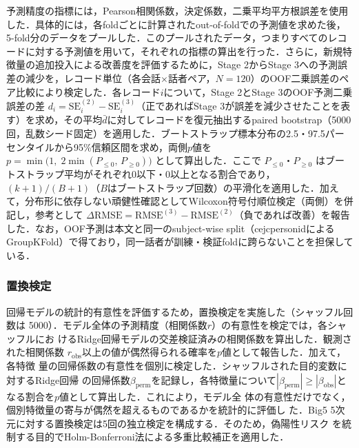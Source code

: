 \documentclass[dvipdfmx,11pt,a4paper]{bxjsarticle}
\renewcommand{\_}{\paperorigunderscore\allowbreak}%
\begin{document}
予測精度の指標には，Pearson相関係数，決定係数，二乗平均平方根誤差を使用した．具体的には，各foldごとに計算されたout-of-foldでの予測値を求めた後，5-fold分のデータをプールした．このプールされたデータ，つまりすべてのレコードに対する予測値を用いて，それぞれの指標の算出を行った．さらに，新規特徴量の追加投入による改善度を評価するために，Stage 2からStage 3への予測誤差の減少を，レコード単位（各会話$\times$話者ペア，$N=120$）のOOF二乗誤差のペア比較により検定した．各レコード$i$について，Stage 2とStage 3のOOF予測二乗誤差の差 $d_i = \mathrm{SE}^{(2)}_i - \mathrm{SE}^{(3)}_i$（正であればStage 3が誤差を減少させたことを表す）を求め，その平均$\bar{d}$に対してレコードを復元抽出するpaired bootstrap（5000回，乱数シード固定）を適用した．ブートストラップ標本分布の2.5・97.5パーセンタイルから95\%信頼区間を求め，両側$p$値を $p = \min\!\bigl(1,\; 2\min(P_{\le 0},\, P_{\ge 0})\bigr)$ として算出した．ここで $P_{\le 0}$・$P_{\ge 0}$ はブートストラップ平均がそれぞれ0以下・0以上となる割合であり，$(k+1)/(B+1)$（$B$はブートストラップ回数）の平滑化を適用した．加えて，分布形に依存しない頑健性確認としてWilcoxon符号付順位検定（両側）を併記し，参考として $\Delta\mathrm{RMSE} = \mathrm{RMSE}^{(3)} - \mathrm{RMSE}^{(2)}$（負であれば改善）を報告した．なお，OOF予測は本文と同一のsubject-wise split（cejc\_person\_idによるGroupKFold）で得ており，同一話者が訓練・検証foldに跨らないことを担保している．


\subsubsection{置換検定}

回帰モデルの統計的有意性を評価するため，置換検定を実施した（シャッフル回数は
5000）．モデル全体の予測精度（相関係数$r$）の有意性を検定では，各シャッフルにお
けるRidge回帰モデルの交差検証済みの相関係数を算出した．観測された相関係数
$r_{\text{obs}}$以上の値が偶然得られる確率を$p$値として報告した．加えて，各特徴
量の回帰係数の有意性を個別に検定した．シャッフルされた目的変数に対するRidge回帰
の回帰係数$\beta_{\text{perm}}$を記録し，各特徴量について$|\beta_{\text{perm}}|
\geq |\beta_{\text{obs}}|$となる割合を$p$値として算出した．これにより，モデル全
体の有意性だけでなく，個別特徴量の寄与が偶然を超えるものであるかを統計的に評価し
た．Big5 5次元に対する置換検定は5回の独立検定を構成する．そのため，偽陽性リスク
を統制する目的でHolm-Bonferroni法\cite{holm1979}による多重比較補正を適用した．

\end{document}
